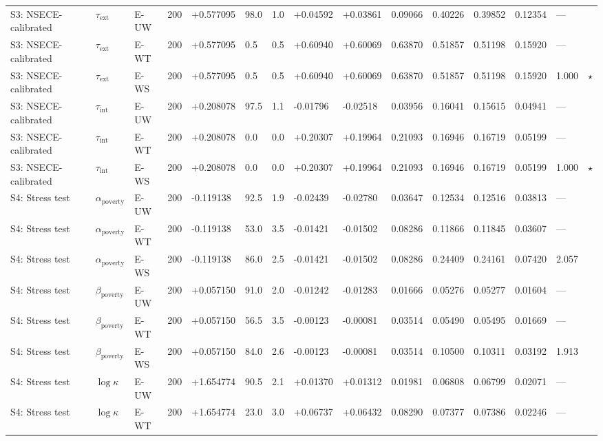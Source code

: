 \begin{table}[htbp]
\begin{tabular}{lllrlllllllllll}
  S3: NSECE-calibrated & $\tau_{\text{ext}}$ & E-UW & 200 & +0.577095 & 98.0 & 1.0 & +0.04592 & +0.03861 & 0.09066 & 0.40226 & 0.39852 & 0.12354 & --- &  \\ 
  S3: NSECE-calibrated & $\tau_{\text{ext}}$ & E-WT & 200 & +0.577095 & 0.5 & 0.5 & +0.60940 & +0.60069 & 0.63870 & 0.51857 & 0.51198 & 0.15920 & --- &  \\ 
  S3: NSECE-calibrated & $\tau_{\text{ext}}$ & E-WS & 200 & +0.577095 & 0.5 & 0.5 & +0.60940 & +0.60069 & 0.63870 & 0.51857 & 0.51198 & 0.15920 & 1.000 & $\star$ \\ 
  S3: NSECE-calibrated & $\tau_{\text{int}}$ & E-UW & 200 & +0.208078 & 97.5 & 1.1 & -0.01796 & -0.02518 & 0.03956 & 0.16041 & 0.15615 & 0.04941 & --- &  \\ 
  S3: NSECE-calibrated & $\tau_{\text{int}}$ & E-WT & 200 & +0.208078 & 0.0 & 0.0 & +0.20307 & +0.19964 & 0.21093 & 0.16946 & 0.16719 & 0.05199 & --- &  \\ 
  S3: NSECE-calibrated & $\tau_{\text{int}}$ & E-WS & 200 & +0.208078 & 0.0 & 0.0 & +0.20307 & +0.19964 & 0.21093 & 0.16946 & 0.16719 & 0.05199 & 1.000 & $\star$ \\ 
  S4: Stress test & $\alpha_{\text{poverty}}$ & E-UW & 200 & -0.119138 & 92.5 & 1.9 & -0.02439 & -0.02780 & 0.03647 & 0.12534 & 0.12516 & 0.03813 & --- &  \\ 
  S4: Stress test & $\alpha_{\text{poverty}}$ & E-WT & 200 & -0.119138 & 53.0 & 3.5 & -0.01421 & -0.01502 & 0.08286 & 0.11866 & 0.11845 & 0.03607 & --- &  \\ 
  S4: Stress test & $\alpha_{\text{poverty}}$ & E-WS & 200 & -0.119138 & 86.0 & 2.5 & -0.01421 & -0.01502 & 0.08286 & 0.24409 & 0.24161 & 0.07420 & 2.057 &  \\ 
  S4: Stress test & $\beta_{\text{poverty}}$ & E-UW & 200 & +0.057150 & 91.0 & 2.0 & -0.01242 & -0.01283 & 0.01666 & 0.05276 & 0.05277 & 0.01604 & --- &  \\ 
  S4: Stress test & $\beta_{\text{poverty}}$ & E-WT & 200 & +0.057150 & 56.5 & 3.5 & -0.00123 & -0.00081 & 0.03514 & 0.05490 & 0.05495 & 0.01669 & --- &  \\ 
  S4: Stress test & $\beta_{\text{poverty}}$ & E-WS & 200 & +0.057150 & 84.0 & 2.6 & -0.00123 & -0.00081 & 0.03514 & 0.10500 & 0.10311 & 0.03192 & 1.913 &  \\ 
  S4: Stress test & $\log\kappa$ & E-UW & 200 & +1.654774 & 90.5 & 2.1 & +0.01370 & +0.01312 & 0.01981 & 0.06808 & 0.06799 & 0.02071 & --- &  \\ 
  S4: Stress test & $\log\kappa$ & E-WT & 200 & +1.654774 & 23.0 & 3.0 & +0.06737 & +0.06432 & 0.08290 & 0.07377 & 0.07386 & 0.02246 & --- &  \\ 

\end{tabular}
\end{table}
